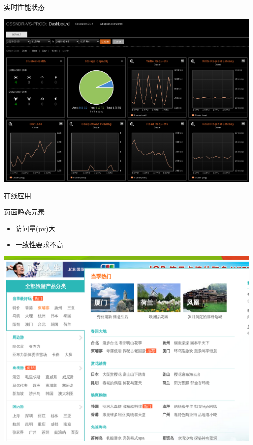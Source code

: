 \documentclass{beamer}
\begin{document}
\begin{CJK}{UTF8}{gbsn}
\begin{frame}{实时性能状态}
  \begin{center}
    \includegraphics[scale=0.2]{./images/runtime-status}
  \end{center}
\end{frame}

\begin{frame}{在线应用}
  \begin{block}{页面静态元素}
    \begin{itemize}
      \item {访问量(pv)大}
      \item {一致性要求不高}
    \end{itemize}
  \end{block}
  \pause
  \begin{center}
    \includegraphics[scale=0.2]{./images/homepage-leftnav}
  \end{center}
\end{frame}


\end{CJK}
\end{document}
